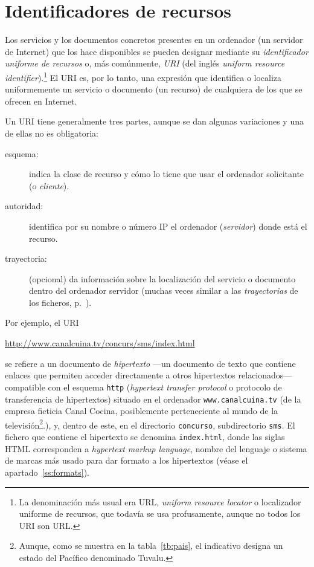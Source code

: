 \section{Identificadores de recursos} Los servicios y los documentos concretos presentes en un ordenador (un servidor de Internet) que los hace disponibles se pueden designar mediante su \emph{identificador uniforme de recursos} o, más comúnmente, \emph{URI} (del inglés \emph{uniform resource identifier}).\footnote{La denominación más usual era URL, \emph{uniform resource locator} o localizador uniforme de recursos, que todavía se usa profusamente, aunque no todos los URI son URL.} El URI es, por lo tanto, una expresión que identifica o localiza uniformemente un servicio o documento (un recurso) de cualquiera de los que se ofrecen en Internet. 

Un URI tiene generalmente tres partes, aunque se dan algunas variaciones y una de ellas no es obligatoria: \begin{description} \item[esquema:] indica la clase de recurso y cómo lo tiene que usar el ordenador solicitante (o \emph{cliente}). \item[autoridad:] identifica por su nombre o número IP el ordenador (\emph{servidor}) donde está el recurso. \item[trayectoria:] (opcional) da información sobre la localización del servicio o documento dentro del ordenador servidor (muchas veces similar a las \emph{trayectorias} de los ficheros, p.~\pageref{pg:fitxer}). \end{description} Por ejemplo, el URI \begin{center} \url{http://www.canalcuina.tv/concurs/sms/index.html} \end{center} se refiere a un documento de \emph{hipertexto} ---un documento de texto que contiene enlaces que permiten acceder directamente a otros hipertextos relacionados--- compatible con el esquema \texttt{http} (\emph{hypertext transfer protocol} o protocolo de transferencia de hipertextos) situado en el ordenador \texttt{www.canalcuina.tv} (de la empresa ficticia Canal Cocina, posiblemente perteneciente al mundo de la televisión\footnote{Aunque, como se muestra en la tabla~\ref{tb:pais}, el indicativo designa un estado del Pacífico denominado Tuvalu.}.), y, dentro de este, en el directorio \texttt{concurso}, subdirectorio \texttt{sms}. El fichero que contiene el hipertexto se denomina \texttt{index.html}, donde las siglas HTML corresponden a \emph{hypertext markup language}, nombre del lenguaje o sistema de marcas más usado para dar formato a los hipertextos (véase el apartado~\ref{ss:formats}). 

